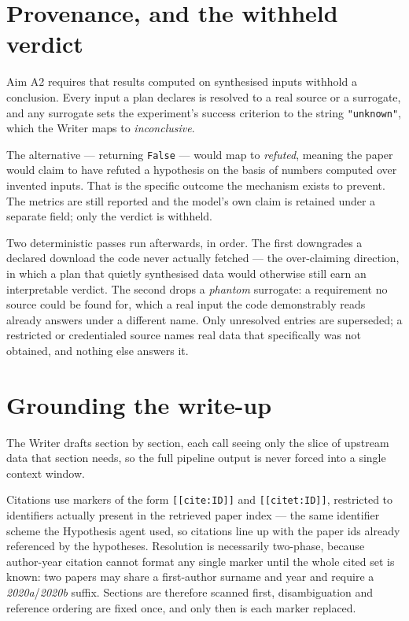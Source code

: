 \section{Provenance, and the withheld verdict}
\label{sec:provenance}

Aim A2 requires that results computed on synthesised inputs withhold a conclusion. Every input
a plan declares is resolved to a real source or a surrogate, and any surrogate sets the
experiment's success criterion to the string \texttt{"unknown"}, which the Writer maps to
\emph{inconclusive}.

The alternative --- returning \texttt{False} --- would map to \emph{refuted}, meaning the paper
would claim to have refuted a hypothesis on the basis of numbers computed over invented inputs.
That is the specific outcome the mechanism exists to prevent. The metrics are still reported
and the model's own claim is retained under a separate field; only the verdict is withheld.

Two deterministic passes run afterwards, in order. The first downgrades a declared download the
code never actually fetched --- the over-claiming direction, in which a plan that quietly
synthesised data would otherwise still earn an interpretable verdict. The second drops a
\emph{phantom} surrogate: a requirement no source could be found for, which a real input the
code demonstrably reads already answers under a different name. Only unresolved entries are
superseded; a restricted or credentialed source names real data that specifically was not
obtained, and nothing else answers it.

\section{Grounding the write-up}
\label{sec:writing}

The Writer drafts section by section, each call seeing only the slice of upstream data that
section needs, so the full pipeline output is never forced into a single context window.

Citations use markers of the form \texttt{[[cite:ID]]} and \texttt{[[citet:ID]]}, restricted to
identifiers actually present in the retrieved paper index --- the same identifier scheme the
Hypothesis agent used, so citations line up with the paper ids already referenced by the
hypotheses. Resolution is necessarily two-phase, because author-year citation cannot format any
single marker until the whole cited set is known: two papers may share a first-author surname
and year and require a \emph{2020a}/\emph{2020b} suffix. Sections are therefore scanned first,
disambiguation and reference ordering are fixed once, and only then is each marker replaced.

